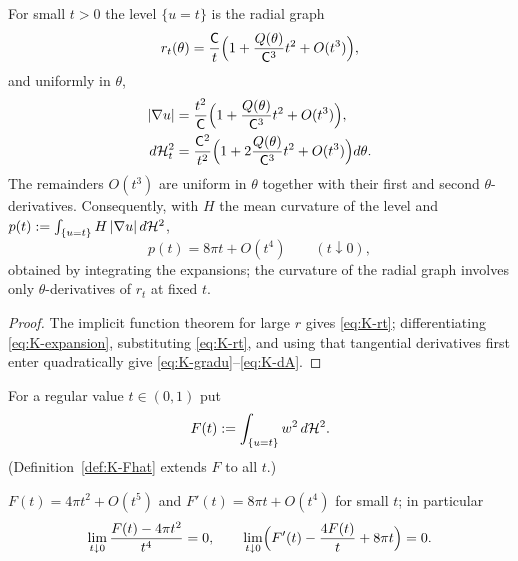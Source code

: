 \begin{lemma}\label{lem:K-level-asymptotics}
For small $t>0$ the level $\{u=t\}$ is the radial graph
\begin{equation}\label{eq:K-rt}
  r_t(\theta)=\frac{\mathsf C}{t}\Bigl(1+\frac{Q(\theta)}{\mathsf C^3}t^2+O(t^3)\Bigr),
\end{equation}
and uniformly in $\theta$,
\begin{align}
  |\nabla u|&=\frac{t^2}{\mathsf C}
     \Bigl(1+\frac{Q(\theta)}{\mathsf C^3}t^2+O(t^3)\Bigr),
     \label{eq:K-gradu}\\
  d\mathcal H^2_t&=\frac{\mathsf C^2}{t^2}
     \Bigl(1+2\frac{Q(\theta)}{\mathsf C^3}t^2+O(t^3)\Bigr)d\theta .
     \label{eq:K-dA}
\end{align}
The remainders $O(t^3)$ are uniform in $\theta$ together with their first and
second $\theta$-derivatives.  Consequently, with $H$ the mean curvature of the
level and $p(t):=\int_{\{u=t\}}H\,|\nabla u|\,d\mathcal H^2$,
\begin{equation}\label{eq:K-p-expansion}
  p(t)=8\pi t+O(t^4)\qquad(t\downarrow0),
\end{equation}
obtained by integrating the expansions; the curvature of the radial graph
involves only $\theta$-derivatives of $r_t$ at fixed $t$.
\end{lemma}

\begin{proof}
The implicit function theorem for large $r$ gives \eqref{eq:K-rt};
differentiating \eqref{eq:K-expansion}, substituting \eqref{eq:K-rt}, and using
that tangential derivatives first enter quadratically give
\eqref{eq:K-gradu}--\eqref{eq:K-dA}.
\end{proof}

\begin{definition}\label{def:K-F}
For a regular value $t\in(0,1)$ put
\[
  F(t):=\int_{\{u=t\}}w^2\,d\mathcal H^2 .
\]
(Definition~\ref{def:K-Fhat} extends $F$ to all $t$.)
\end{definition}

\begin{lemma}\label{lem:K-far-field}
$F(t)=4\pi t^2+O(t^5)$ and $F'(t)=8\pi t+O(t^4)$ for small $t$; in particular
\begin{equation}\label{eq:K-far-field-limits}
  \lim_{t\downarrow0}\frac{F(t)-4\pi t^2}{t^4}=0,
  \qquad
  \lim_{t\downarrow0}\Bigl(F'(t)-\frac{4F(t)}{t}+8\pi t\Bigr)=0 .
\end{equation}
\end{lemma}

